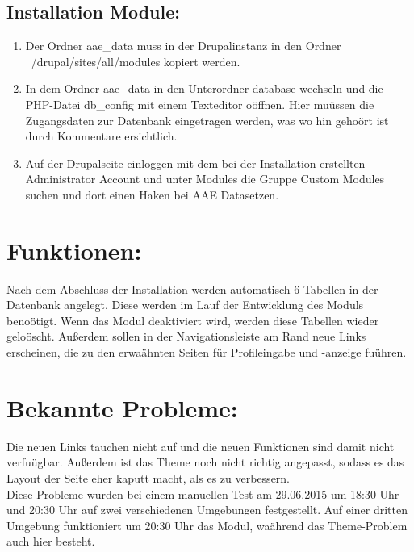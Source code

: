 \documentclass{swp}
\begin{document}
\subsection{Installation Module:}
\begin{enumerate}
\item Der Ordner \glqq aae\_{}data\grqq{} muss in der Drupalinstanz in den Ordner \glqq ~/drupal/sites/all/modules\grqq{} kopiert werden.
\item In dem Ordner \glqq aae\_{}data\grqq{} in den Unterordner \glqq database\grqq{} wechseln und die PHP-Datei \glqq db\_{}config\grqq{} mit einem Texteditor o\"offnen. Hier mu\"ussen die Zugangsdaten zur Datenbank eingetragen werden, was wo hin geho\"ort ist durch Kommentare ersichtlich.
\item Auf der Drupalseite einloggen mit dem bei der Installation erstellten Administrator Account und unter \glqq Modules\grqq{} die Gruppe \glqq Custom Modules\grqq{} suchen und dort einen Haken bei \glqq AAE Data\grqq setzen.
\end{enumerate}
\section{Funktionen:}
Nach dem Abschluss der Installation werden automatisch 6 Tabellen in der Datenbank angelegt. Diese werden im Lauf der Entwicklung des Moduls beno\"otigt. Wenn das Modul deaktiviert wird, werden diese Tabellen wieder gelo\"oscht. Au{\ss}erdem sollen in der Navigationsleiste am Rand neue Links erscheinen, die zu den erwa\"ahnten Seiten f\"ur Profileingabe und -anzeige fu\"uhren.
\section{Bekannte Probleme:}
Die neuen Links tauchen nicht auf und die neuen Funktionen sind damit nicht verfu\"ugbar. Au{\ss}erdem ist das Theme noch nicht richtig angepasst, sodass es das Layout der Seite eher kaputt macht, als es zu verbessern.\\
Diese Probleme wurden bei einem manuellen Test am 29.06.2015 um 18:30 Uhr und 20:30 Uhr auf zwei verschiedenen Umgebungen festgestellt. Auf einer dritten Umgebung funktioniert um 20:30 Uhr das Modul, wa\"ahrend das Theme-Problem auch hier besteht.
\end{document}
